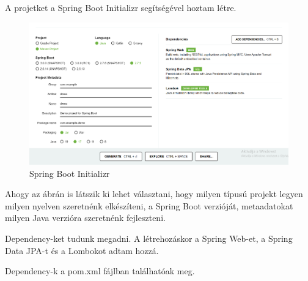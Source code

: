 

A projetket a Spring Boot Initializr segítségével hoztam létre.

\begin{figure}[h]
\centering
\includegraphics[scale=0.37]{images/Spring_init.png}
\caption{Spring Boot Initializr}
\label{fig:Spring_Boot_Initializr}
\end{figure}

Ahogy az ábrán is látszik ki lehet választani, hogy milyen típusú projekt legyen milyen nyelven szeretnénk elkészíteni, a Spring Boot verzióját, metaadatokat milyen Java verzióra szeretnénk fejleszteni.

Dependency-ket tudunk megadni. A létrehozáskor a Spring Web-et, a Spring Data JPA-t és a Lombokot adtam hozzá.

Dependency-k a pom.xml fájlban találhatóak meg. 

